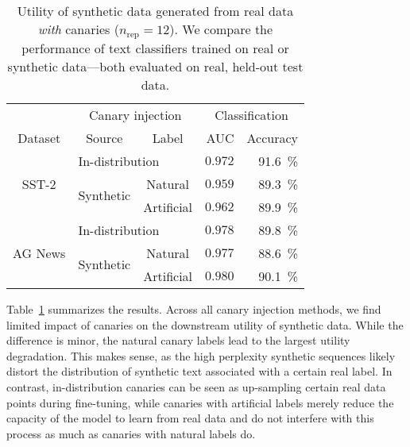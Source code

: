 \begin{table}[h]
    \centering
    \begin{tabular}{ccc@{\hskip 15pt}rr}
    \toprule
        & \multicolumn{2}{c}{Canary injection} & \multicolumn{2}{c}{Classification}\\
        \cmidrule(lr){2-3} \cmidrule(lr){4-5}
        Dataset & Source & Label & AUC & Accuracy \\
        \midrule
        \multirow{3}{*}{\parbox{1cm}{\centering SST-2}} & \multicolumn{2}{l}{In-distribution} & $0.972$ & \SI{91.6}{\percent} \\ 
        \cmidrule{2-5}
         & \multirow{2}{*}{\parbox{1.8cm}{Synthetic}} & Natural & $0.959$ & \SI{89.3}{\percent} \\ 
         & & Artificial & $0.962$ & \SI{89.9}{\percent} \\ 
        \midrule
        \multirow{3}{*}{\parbox{2cm}{\centering AG News}} & \multicolumn{2}{l}{In-distribution} & $0.978$ & \SI{89.8}{\percent}\\ 
        \cmidrule{2-5} 
         & \multirow{2}{*}{\parbox{1.8cm}{Synthetic}} & Natural & $0.977$ & \SI{88.6}{\percent} \\ 
         & & Artificial & $0.980$ & \SI{90.1}{\percent} \\         
         \bottomrule
    \end{tabular}
    \caption{Utility of synthetic data generated from real data \emph{with} canaries ($n_\textrm{rep}=12$). We compare the performance of text classifiers trained on real or synthetic data---both evaluated on real, held-out test data.}
    \label{tab:utility_canaries}
\end{table}

Table~\ref{tab:utility_canaries} summarizes the results. Across all canary injection methods, we find limited impact of canaries on the downstream utility of synthetic data. While the difference is minor, the natural canary labels lead to the largest utility degradation. This makes sense, as the high perplexity synthetic sequences likely distort the distribution of synthetic text associated with a certain real label. In contrast, in-distribution canaries can be seen as up-sampling certain real data points during fine-tuning, while canaries with artificial labels merely reduce the capacity of the model to learn from real data and do not interfere with this process as much as canaries with natural labels do.
